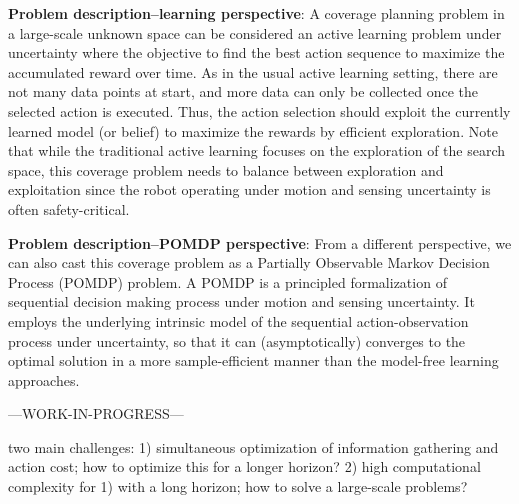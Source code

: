 \documentclass{article}
\newcommand{\ph}[1]{{\textbf{#1}:}} %
\begin{document}

%
%


\ph{Problem description--learning perspective}
A coverage planning problem in a large-scale unknown space can be considered an active learning problem under uncertainty where the objective to find the best action sequence to maximize the accumulated reward over time.
As in the usual active learning setting, there are not many data points at start, and more data can only be collected once the selected action is executed.
Thus, the action selection should exploit the currently learned model (or belief) to maximize the rewards by efficient exploration.
Note that while the traditional active learning focuses on the exploration of the search space, this coverage problem needs to balance between exploration and exploitation since the robot operating under motion and sensing uncertainty is often safety-critical. 

\ph{Problem description--POMDP perspective}
From a different perspective, we can also cast this coverage problem as a Partially Observable Markov Decision Process (POMDP) problem. 
A POMDP is a principled formalization of sequential decision making process under motion and sensing uncertainty.
It employs the underlying intrinsic model of the sequential action-observation process under uncertainty, so that it can (asymptotically) converges to the optimal solution in a more sample-efficient manner than the model-free learning approaches.


---WORK-IN-PROGRESS---

two main challenges:
1) simultaneous optimization of information gathering and action cost; how to optimize this for a longer horizon?
2) high computational complexity for 1) with a long horizon; how to solve a large-scale problems?
\end{document}
